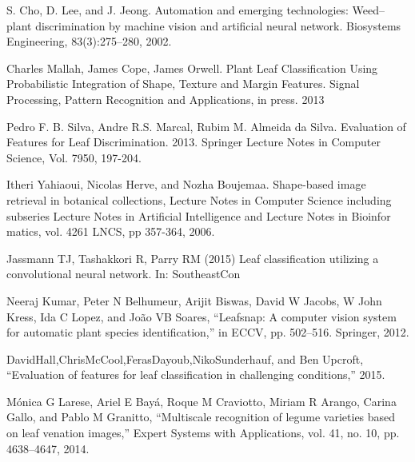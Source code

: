 \documentclass[journal, 10pt]{IEEEtran}
\begin{document}
%
%
%
\begin{thebibliography}{1}

    S. Cho, D. Lee, and J. Jeong. Automation and emerging technologies: Weed–plant discrimination by machine vision and artificial neural network. Biosystems Engineering, 83(3):275–280, 2002.

    Charles Mallah, James Cope, James Orwell. Plant Leaf Classification Using Probabilistic Integration of Shape, Texture and Margin Features. Signal Processing, Pattern Recognition and Applications, in press. 2013

    Pedro F. B. Silva, Andre R.S. Marcal, Rubim M. Almeida da Silva. Evaluation of Features for Leaf Discrimination. 2013. Springer Lecture Notes in Computer Science, Vol. 7950, 197-204.

    Itheri Yahiaoui, Nicolas Herve, and Nozha Boujemaa. Shape-based image retrieval in botanical collections, Lecture Notes in Computer Science including subseries Lecture Notes in Artificial Intelligence and Lecture Notes in Bioinfor matics, vol. 4261 LNCS, pp 357-364, 2006.

    Jassmann TJ, Tashakkori R, Parry RM (2015) Leaf classification utilizing a convolutional neural network. In: SoutheastCon

    Neeraj Kumar, Peter N Belhumeur, Arijit Biswas, David W Jacobs, W John Kress, Ida C Lopez, and João VB Soares, “Leafsnap: A computer vision system for automatic plant species identification,” in ECCV, pp. 502–516. Springer, 2012.

    DavidHall,ChrisMcCool,FerasDayoub,NikoSunderhauf, and Ben Upcroft, “Evaluation of features for leaf classification in challenging conditions,” 2015.

    Mónica G Larese, Ariel E Bayá, Roque M Craviotto, Miriam R Arango, Carina Gallo, and Pablo M Granitto, “Multiscale recognition of legume varieties based on leaf venation images,” Expert Systems with Applications, vol. 41, no. 10, pp. 4638–4647, 2014.


\end{thebibliography}
\end{document}
